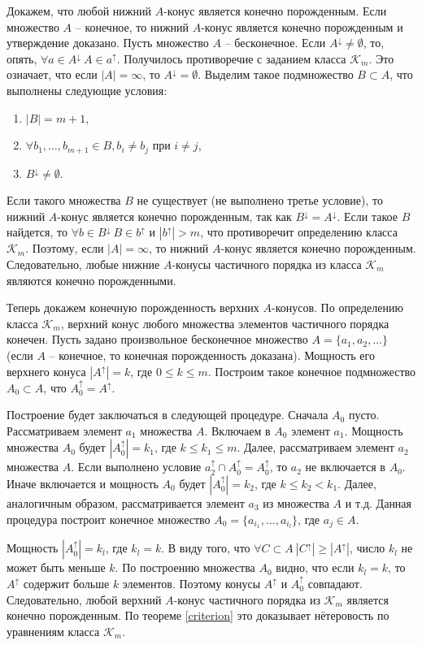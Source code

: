 \documentclass[12pt]{article}
\theoremstyle{break}
\def\K{\mathcal{K}_m}
\begin{document}
		Докажем, что любой нижний $A$-конус является конечно порожденным. Если множество $A$ -- конечное, то нижний $A$-конус является конечно порожденным и утверждение доказано. Пусть множество $A$ -- бесконечное. Если $A^{\downarrow} \neq \emptyset$, то, опять, $\forall a\in A^{\downarrow}~A\in a^{\uparrow}$. Получилось противоречие с заданием класса $\K$. Это означает, что если $|A| = \infty$, то $A^{\downarrow} = \emptyset$. Выделим такое подмножество $B\subset A$, что выполнены следующие условия:
		\begin{enumerate}
			\item $|B| = m + 1$,
			\item $\forall b_1,\dots,b_{m+1}\in B, b_i\neq b_j$ при $i\neq j$,
			\item $B^{\downarrow} \neq \emptyset$.
		\end{enumerate}
		Если такого множества $B$ не существует (не выполнено третье условие), то нижний $A$-конус является конечно порожденным, так как $B^{\downarrow} = A^{\downarrow}$. Если такое $B$ найдется, то $\forall b\in B^{\downarrow}~B\in b^{\uparrow}$ и $|b^{\uparrow}| > m$, что противоречит определению класса $\K$. Поэтому, если $|A|=\infty$, то нижний $A$-конус является конечно порожденным. Следовательно, любые нижние $A$-конусы частичного порядка из класса $\K$ являются конечно порожденными.

		Теперь докажем конечную порожденность верхних $A$-конусов. По определению класса $\K$, верхний конус любого множества элементов частичного порядка конечен. Пусть задано произвольное бесконечное множество $A = \{a_1, a_2,\dots\}$ (если $A$ -- конечное, то конечная порожденность доказана). Мощность его верхнего конуса $|A^{\uparrow}| = k$, где $0\leqslant k\leqslant m$. Построим такое конечное подмножество $A_0\subset A$, что $A_0^{\uparrow} = A^{\uparrow}$.

		Построение будет заключаться в следующей процедуре. Сначала $A_0$ пусто. Рассматриваем элемент $a_1$ множества $A$. Включаем в $A_0$ элемент $a_1$. Мощность множества $A_0$ будет $|A_0^{\uparrow}| = k_1$, где $k\leqslant k_1\leqslant m$. Далее, рассматриваем элемент $a_2$ множества $A$. Если выполнено условие $a_2^{\uparrow} \cap A_0^{\uparrow} = A_0^{\uparrow}$, то $a_2$ не включается в $A_0$. Иначе включается и мощность $A_0$ будет $|A_0^{\uparrow}| = k_2$, где $k\leqslant k_2 < k_1$. Далее, аналогичным образом, рассматривается элемент $a_3$ из множества $A$ и т.д. Данная процедура построит конечное множество $A_0=\{a_{i_1},\dots, a_{i_l}\}$, где $a_j\in A$.

		Мощность $|A_0^{\uparrow}| = k_l$, где $k_l = k$. В виду того, что $\forall C\subset A~|C^{\uparrow}| \geqslant |A^{\uparrow}|$, число $k_l$ не может быть меньше $k$. По построению множества $A_0$ видно, что если $k_l = k$, то $A^{\uparrow}$ содержит больше $k$ элементов. Поэтому конусы $A^{\uparrow}$ и $A_0^{\uparrow}$ совпадают. Следовательно, любой верхний $A$-конус частичного порядка из $\K$ является конечно порожденным. По теореме \ref{criterion} это доказывает нётеровость по уравнениям класса $\K$.

		

	
\end{document}
